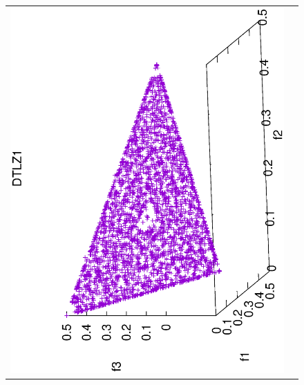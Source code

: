 \begin{figure}[H]
\begin{tabular}{cc}
  \includegraphics[scale=0.3, angle=-90,origin=c]{Figures_Chapter7/Results_Chapter4/Summary_Representative/VSD-MOEA/DTLZ1.eps}  &

\end{tabular}
\end{figure}
